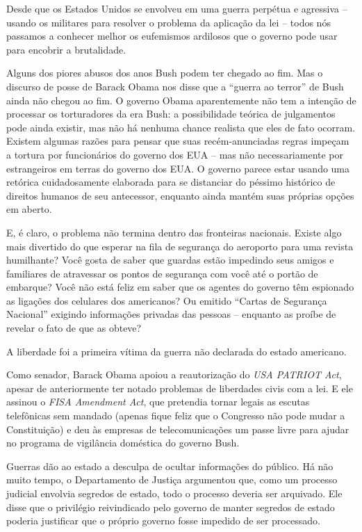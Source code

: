 Desde que os Estados Unidos se envolveu em uma guerra perpétua e agressiva -- usando os militares para resolver o problema da aplicação da lei -- todos nós passamos a conhecer melhor os eufemismos ardilosos que o governo pode usar para encobrir a brutalidade.

Alguns dos piores abusos dos anos Bush podem ter chegado ao fim. Mas o discurso de posse de Barack Obama nos disse que a ``guerra ao terror'' de Bush ainda não chegou ao fim. O governo Obama aparentemente não tem a intenção de processar os torturadores da era Bush: a possibilidade teórica de julgamentos pode ainda existir, mas não há nenhuma chance realista que eles de fato ocorram. Existem algumas razões para pensar que suas recém-anunciadas regras impeçam a tortura por funcionários do governo dos EUA -- mas não necessariamente por estrangeiros em terras do governo dos EUA. O governo parece estar usando uma retórica cuidadosamente elaborada para se distanciar do péssimo histórico de direitos humanos de seu antecessor, enquanto ainda mantém suas próprias opções em aberto. 

E, é claro, o problema não termina dentro das fronteiras nacionais. Existe algo mais divertido do que esperar na fila de segurança do aeroporto para uma revista humilhante? Você gosta de saber que guardas estão impedindo seus amigos e familiares de atravessar os pontos de segurança com você até o portão de embarque? Você não está feliz em saber que os agentes do governo têm espionado as ligações dos celulares dos americanos? Ou emitido ``Cartas de Segurança Nacional'' exigindo informações privadas das pessoas -- enquanto as proíbe de revelar o fato de que as obteve?

A liberdade foi a primeira vítima da guerra não declarada do estado americano.

Como senador, Barack Obama apoiou a reautorização do \emph{USA PATRIOT Act}, apesar de anteriormente ter notado problemas de liberdades civis com a lei. E ele assinou o \emph{FISA Amendment Act}, que pretendia tornar legais as escutas telefônicas sem mandado (apenas fique feliz que o Congresso não pode mudar a Constituição) e deu às empresas de telecomunicações um passe livre para ajudar no programa de vigilância doméstica do governo Bush.

Guerras dão ao estado a desculpa de ocultar informações do público. Há não muito tempo, o Departamento de Justiça argumentou que, como um processo judicial envolvia segredos de estado, todo o processo deveria ser arquivado. Ele disse que o privilégio reivindicado pelo governo de manter segredos de estado poderia justificar que o próprio governo fosse impedido de ser processado.


